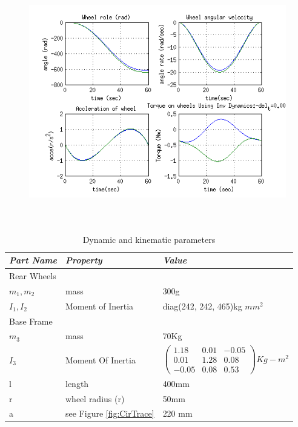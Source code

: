  \begin{figure}
	\includegraphics[height=300pt,keepaspectratio]{Chapter4/fig/FD}
	\label{fig:spiral} 
\end{figure} 
%
\begin{table}[!htbp]
	\caption{Dynamic and kinematic parameters }
	\label{tb:massproperty}
	\centering
	\begin{tabular}{l l l}
		\hline
		\emph{Part Name}  & \emph{ Property} & \emph{Value} \\
		\hline
		Rear Wheels & & \\
		 $m_1,m_2$	& mass				&300g \\ 
		  $I_1,I_2$	& Moment of Inertia	& diag(242, 242, 465)kg $mm^2$\\
		Base Frame& & \\
		 $m_3$ & mass  & 70Kg \\
		 $ I_3$& Moment Of Inertia & $ \begin{pmatrix}
		 1.18& 0.01&-0.05\\ 0.01 & 1.28 & 0.08\\
		 -0.05 & 0.08 & 0.53
		 \end{pmatrix} Kg-m^2$ \\
		   l & length & 400mm\\
		  r & wheel radius (r) & 50mm\\
		 a & see Figure \ref{fig:CirTrace} & 220 mm \\ 
		\hline
		\end{tabular}
\end{table}



